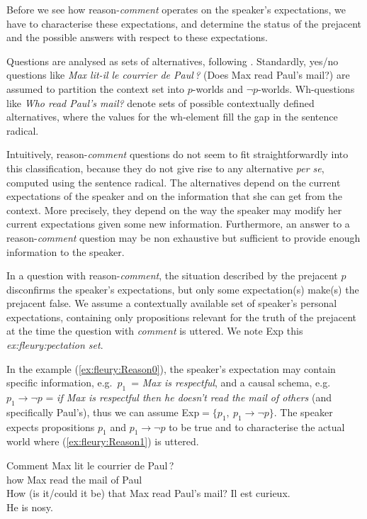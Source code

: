 \documentclass[output=paper,colorlinks,citecolor=brown,
]{langscibook}
\begin{document}
Before we see how  reason-\textit{comment} operates on the speaker's expectations, we have to characterise these expectations, and determine the status of the prejacent and the possible answers with respect to  these expectations.

Questions are analysed as sets of alternatives, following \cite{GroenendijkStokhof84:thesis}.
Standardly, yes/no questions like 
\textit{Max lit-il le courrier de Paul\,?} (Does Max read Paul's mail?)
 are  assumed to partition the context set into  $p$-worlds and $\neg p$-worlds.
Wh-questions like
\textit{Who read Paul's mail?} 
denote sets of possible contextually defined alternatives, where the values for the wh-element fill the gap in the sentence radical.

Intuitively,  reason-\textit{comment} questions do not seem to fit straightforwardly into this classification, because they do not  give rise to any alternative \textit{per se}, computed using the sentence radical.
The alternatives depend on the current expectations of the speaker and on the information that she can get from the context.
More precisely, they depend on the way the speaker may modify her current expectations given some new information.
Furthermore, an answer to a reason-\textit{comment} question may be non exhaustive but sufficient to provide enough information to the speaker.

In a question with reason-\textit{comment}, the situation described by the prejacent $p$ disconfirms the speaker's expectations, but only some expectation(s) make(s) the prejacent false. We assume a contextually available set of speaker's personal expectations, containing only propositions relevant for the truth of the prejacent at the time the question with \textit{comment} is uttered. We note Exp this {\textit{ex:fleury:pectation set}}. 

In the example (\ref{ex:fleury:Reason0}), the speaker's expectation may contain
specific information, e.g.\  $p_1$~= \textit{Max is respectful}, and 
 a causal schema, e.g.\   $p_1 \rightarrow \neg p$ = \textit{if Max is respectful then he doesn't read the mail of others} (and specifically Paul's), thus we can assume 
Exp$=\{p_1,~p_1 \rightarrow \neg p\}$.
 The speaker expects propositions $p_1$ and $p_1 \rightarrow \neg p$ to be true and to characterise the actual world where (\ref{ex:fleury:Reason1}) is uttered.
\begin{exe}
\ex\label{ex:fleury:Reason0}
\begin{xlist}
\ex\label{ex:fleury:Reason1} \gll Comment Max lit le courrier de Paul\,? \\
how Max read the mail of Paul \\
\glt How (is it/could it be) that Max read Paul's mail?
\ex\label{ex:fleury:Reason2}  Il est curieux. \\
 He is nosy.
\end{xlist}
\end{exe}
\end{document}
